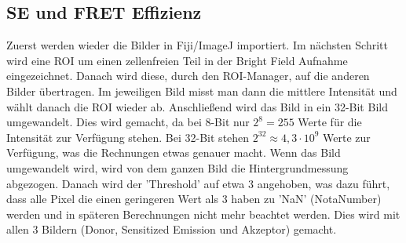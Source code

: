 \subsection{SE und FRET Effizienz}
Zuerst werden wieder die Bilder in Fiji/ImageJ importiert.
Im nächsten Schritt wird eine ROI um einen zellenfreien Teil in der Bright Field Aufnahme eingezeichnet.
Danach wird diese, durch den ROI-Manager, auf die anderen Bilder übertragen.
Im jeweiligen Bild misst man dann die mittlere Intensität und wählt danach die ROI wieder ab.
Anschließend wird das Bild in ein 32-Bit Bild umgewandelt. Dies wird gemacht, da bei 8-Bit nur $2^8=255$ Werte für die Intensität zur Verfügung stehen.
Bei 32-Bit stehen $2^{32}\approx4,3\cdot10^9$ Werte zur Verfügung, was die Rechnungen etwas genauer macht.
Wenn das Bild umgewandelt wird, wird von dem ganzen Bild die Hintergrundmessung abgezogen.
Danach wird der 'Threshold' auf etwa 3 angehoben, was dazu führt, dass alle Pixel die einen geringeren Wert als 3 haben zu 'NaN' (NotaNumber) werden und in späteren Berechnungen nicht mehr beachtet werden.
Dies wird mit allen 3 Bildern (Donor, Sensitized Emission und Akzeptor) gemacht.
